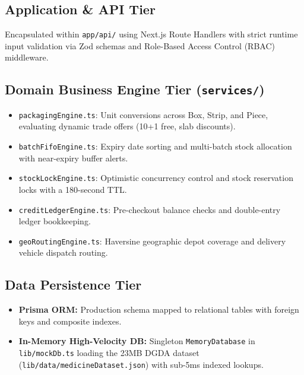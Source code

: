 \documentclass[10pt,a4paper]{article}
\begin{document}
\subsection{Application \& API Tier}
Encapsulated within \texttt{app/api/} using Next.js Route Handlers with strict runtime input validation via Zod schemas and Role-Based Access Control (RBAC) middleware.

\subsection{Domain Business Engine Tier (\texttt{services/})}
\begin{itemize}[leftmargin=*]
    \item \texttt{packagingEngine.ts}: Unit conversions across Box, Strip, and Piece, evaluating dynamic trade offers (10+1 free, slab discounts).
    \item \texttt{batchFifoEngine.ts}: Expiry date sorting and multi-batch stock allocation with near-expiry buffer alerts.
    \item \texttt{stockLockEngine.ts}: Optimistic concurrency control and stock reservation locks with a 180-second TTL.
    \item \texttt{creditLedgerEngine.ts}: Pre-checkout balance checks and double-entry ledger bookkeeping.
    \item \texttt{geoRoutingEngine.ts}: Haversine geographic depot coverage and delivery vehicle dispatch routing.
\end{itemize}

\subsection{Data Persistence Tier}
\begin{itemize}[leftmargin=*]
    \item \textbf{Prisma ORM:} Production schema mapped to relational tables with foreign keys and composite indexes.
    \item \textbf{In-Memory High-Velocity DB:} Singleton \texttt{MemoryDatabase} in \texttt{lib/mockDb.ts} loading the 23MB DGDA dataset (\texttt{lib/data/medicineDataset.json}) with sub-5ms indexed lookups.
\end{itemize}

\end{document}
